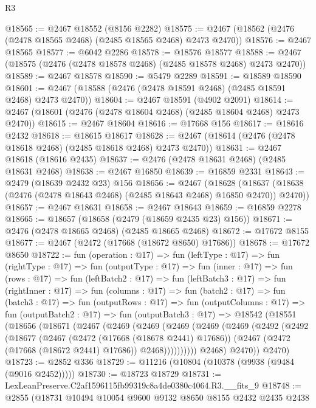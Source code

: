 \begin{lexlean}{R3}
\begin{coremodule}
@18565 := @2467 @18552 (@8156 @2282)
@18575 := @2467 (@18562 (@2476 (@2478 @18565 @2468) (@2485 @18565 @2468) @2473 @2470))
@18576 := @2467 @18565
@18577 := @6042 @2286
@18578 := @18576 @18577
@18588 := @2467 (@18575 (@2476 (@2478 @18578 @2468) (@2485 @18578 @2468) @2473 @2470))
@18589 := @2467 @18578
@18590 := @5479 @2289
@18591 := @18589 @18590
@18601 := @2467 (@18588 (@2476 (@2478 @18591 @2468) (@2485 @18591 @2468) @2473 @2470))
@18604 := @2467 @18591 (@4902 @2091)
@18614 := @2467 (@18601 (@2476 (@2478 @18604 @2468) (@2485 @18604 @2468) @2473 @2470))
@18615 := @2467 @18604
@18616 := @17668 @156
@18617 := @18616 @2432
@18618 := @18615 @18617
@18628 := @2467 (@18614 (@2476 (@2478 @18618 @2468) (@2485 @18618 @2468) @2473 @2470))
@18631 := @2467 @18618 (@18616 @2435)
@18637 := @2476 (@2478 @18631 @2468) (@2485 @18631 @2468)
@18638 := @2467 @16850
@18639 := @16859 @2331
@18643 := @2479 (@18639 @2432 @23) @156
@18656 := @2467
    (@18628 (@18637 (@18638 (@2476 (@2478 @18643 @2468) (@2485 @18643 @2468) @16850 @2470)) @2470))
@18657 := @2467 @18631
@18658 := @2467 @18643
@18659 := @16859 @2278
@18665 := @18657 (@18658 (@2479 (@18659 @2435 @23) @156))
@18671 := @2476 (@2478 @18665 @2468) (@2485 @18665 @2468)
@18672 := @17672 @8155
@18677 := @2467 (@2472 (@17668 (@18672 @8650) @17686))
@18678 := @17672 @8650
@18722 := fun (operation : @17) =>
  fun (leftType : @17) =>
  fun (rightType : @17) =>
  fun (outputType : @17) =>
  fun (inner : @17) =>
  fun (rows : @17) =>
  fun (leftBatch2 : @17) =>
  fun (leftBatch3 : @17) =>
  fun (rightInner : @17) =>
  fun (columns : @17) =>
  fun (batch2 : @17) =>
  fun (batch3 : @17) =>
  fun (outputRows : @17) =>
  fun (outputColumns : @17) =>
  fun (outputBatch2 : @17) =>
  fun (outputBatch3 : @17) =>
  @18542
    (@18551
      (@18656
        (@18671
          (@2467
            (@2469
              (@2469
                (@2469
                  (@2469
                    (@2469
                      (@2492
                        (@2492
                          (@18677
                            (@2467
                              (@2472 (@17668 (@18678 @2441) @17686))
                              (@2467 (@2472 (@17668 (@18672 @2441) @17686)) @2468))))))))))
            @2468)
          @2470))
      @2470)
@18723 := @2852 @336
@18729 := @11216 (@10804 (@10378 (@9938 (@9484 (@9016 @2452)))))
@18730 := @18723 @18729
@18731 := LexLeanPreserve.C2af1596115fb99319c8a4de0380c4064.R3.__fits_9
@18748 := @2855
    (@18731
      @10494
      @10054
      @9600
      @9132
      @8650
      @8155
      @2432
      @2435
      @2438

\end{coremodule}
\end{lexlean}
